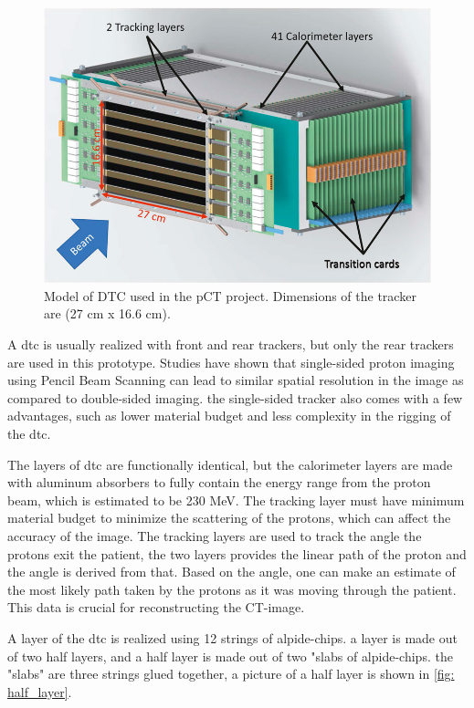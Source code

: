 \documentclass[main.tex]{subfiles}
\begin{document}
\begin{figure}[!ht]
    \centering
    \includegraphics[scale = 0.5]{images/dtc.jpg}
    \caption{Model of DTC used in the pCT project. Dimensions of the tracker are (27 cm x 16.6 cm).}
    \label{fig: DTC_image}
\end{figure}
\FloatBarrier

A \gls{dtc} is usually realized with front and rear trackers, but only the rear trackers are used in this prototype. Studies have shown that single-sided proton imaging using Pencil Beam Scanning can lead to similar spatial resolution in the image as compared to double-sided\cite{pbs_result} imaging. the single-sided tracker also comes with a few advantages, such as lower material budget and less complexity in the rigging of the \gls{dtc}.

The layers of \gls{dtc} are functionally identical, but the calorimeter layers are made with aluminum absorbers to fully contain the energy range from the proton beam, which is estimated to be 230 MeV. The tracking layer must have minimum material budget to minimize the scattering of the protons, which can affect the accuracy of the image. The tracking layers are used to track the angle the protons exit the patient, the two layers provides the linear path of the proton and the angle is derived from that. Based on the angle, one can make an estimate of the most likely path taken by the protons as it was moving through the patient. This data is crucial for reconstructing the CT-image.

A layer of the \gls{dtc} is realized using 12 strings of \gls{alpide}-chips. a layer is made out of two half layers, and a half layer is made out of two "slabs of \gls{alpide}-chips. the "slabs" are three strings glued together, a picture of a half layer is shown in \autoref{fig: half_layer}.
\end{document}
